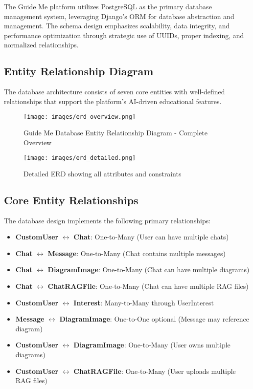 \documentclass[12pt,a4paper]{article}
\begin{document}
The Guide Me platform utilizes PostgreSQL as the primary database management system, leveraging Django's ORM for database abstraction and management. The schema design emphasizes scalability, data integrity, and performance optimization through strategic use of UUIDs, proper indexing, and normalized relationships.

\subsection{Entity Relationship Diagram}

The database architecture consists of seven core entities with well-defined relationships that support the platform's AI-driven educational features.

\begin{figure}[h]
    \centering
    \texttt{[image: images/erd\_overview.png]}
    \caption{Guide Me Database Entity Relationship Diagram - Complete Overview}
    \label{fig:erd_overview}
\end{figure}

\begin{figure}[h]
    \centering
    \texttt{[image: images/erd\_detailed.png]}
    \caption{Detailed ERD showing all attributes and constraints}
    \label{fig:erd_detailed}
\end{figure}

\subsection{Core Entity Relationships}

The database design implements the following primary relationships:

\begin{itemize}
    \item \textbf{CustomUser} $\leftrightarrow$ \textbf{Chat}: One-to-Many (User can have multiple chats)
    \item \textbf{Chat} $\leftrightarrow$ \textbf{Message}: One-to-Many (Chat contains multiple messages)
    \item \textbf{Chat} $\leftrightarrow$ \textbf{DiagramImage}: One-to-Many (Chat can have multiple diagrams)
    \item \textbf{Chat} $\leftrightarrow$ \textbf{ChatRAGFile}: One-to-Many (Chat can have multiple RAG files)
    \item \textbf{CustomUser} $\leftrightarrow$ \textbf{Interest}: Many-to-Many through UserInterest
    \item \textbf{Message} $\leftrightarrow$ \textbf{DiagramImage}: One-to-One optional (Message may reference diagram)
    \item \textbf{CustomUser} $\leftrightarrow$ \textbf{DiagramImage}: One-to-Many (User owns multiple diagrams)
    \item \textbf{CustomUser} $\leftrightarrow$ \textbf{ChatRAGFile}: One-to-Many (User uploads multiple RAG files)
\end{itemize}
\end{document}
